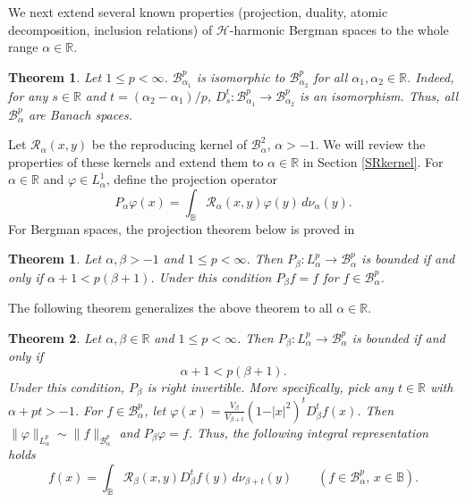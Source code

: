\documentclass{amsart}
\newtheorem{theorem}{Theorem}[section]
\newtheorem{othertheorem}{Theorem}
\theoremstyle{definition}
\theoremstyle{remark}
\begin{document}
We next extend several known properties (projection, duality,
atomic decomposition, inclusion relations) of $\mathcal H$-harmonic
Bergman spaces to the whole range $\alpha\in\mathbb R$.

\begin{theorem}\label{TIso}
Let $1\le p<\infty$.
$\mathcal B^p_{\alpha_1}$ is isomorphic to $\mathcal B^p_{\alpha_2}$
for all $\alpha_1,\alpha_2\in\mathbb R$.
Indeed, for any $s\in\mathbb R$ and $t=(\alpha_2-\alpha_1)/p$,
$D^t_s\colon\mathcal B^p_{\alpha_1}\to\mathcal B^p_{\alpha_2}$ is an
isomorphism.
Thus, all $\mathcal B^p_\alpha$ are Banach spaces.
\end{theorem}

Let $\mathcal R_\alpha(x,y)$ be the reproducing kernel of $\mathcal B^2_\alpha$,
$\alpha>-1$.
We will review the properties of these kernels and extend them
to $\alpha\in\mathbb R$ in Section \ref{SRkernel}.
For $\alpha\in\mathbb R$ and $\varphi\in L^1_\alpha$, define the projection
operator
\begin{equation*}
P_\alpha \varphi(x)=\int_{\mathbb B}\mathcal R_\alpha(x,y)\varphi(y)
\,d\nu_\alpha(y).
\end{equation*}
For Bergman spaces, the projection theorem below is proved
in \cite[Theorem 1.1]{U}

\begin{othertheorem}\label{TProjBergman}
Let $\alpha,\beta>-1$ and $1\le p<\infty$.
Then $P_\beta\colon L^p_\alpha\to\mathcal B^p_\alpha$ is bounded if and
only if $\alpha+1<p(\beta+1)$.
Under this condition $P_\beta f=f$ for $f\in\mathcal B^p_\alpha$.
\end{othertheorem}

The following theorem generalizes the above theorem to
all $\alpha\in\mathbb R$.

\begin{theorem}\label{TProjBesov}
Let $\alpha, \beta\in\mathbb R$ and $1\le p<\infty$.
Then $P_\beta\colon L^p_\alpha\to\mathcal B^p_\alpha$ is bounded if and only if
\begin{equation}\label{projineq}
\alpha+1<p(\beta+1).
\end{equation}
Under this condition, $P_\beta$ is right invertible.
More specifically, pick any $t\in\mathbb R$ with $\alpha+pt>-1$.
For $f\in\mathcal B^p_\alpha$, let
$\varphi(x)=\frac{V_\beta}{V_{\beta+t}}(1-\vert x\vert^2)^tD^t_\beta f(x)$.
Then $\|\varphi\|_{L^p_\alpha}\sim\|f\|_{\mathcal B^p_\alpha}$ and
$P_\beta\varphi=f$.
Thus, the following integral representation holds
\begin{equation}\label{IntRep}
f(x)=\int_{\mathbb B}
\mathcal R_\beta(x,y) D^t_\beta f(y)\,d\nu_{\beta+t}(y)
\qquad (f\in\mathcal B^p_\alpha,\, x\in\mathbb B).
\end{equation}
\end{theorem}
\end{document}
